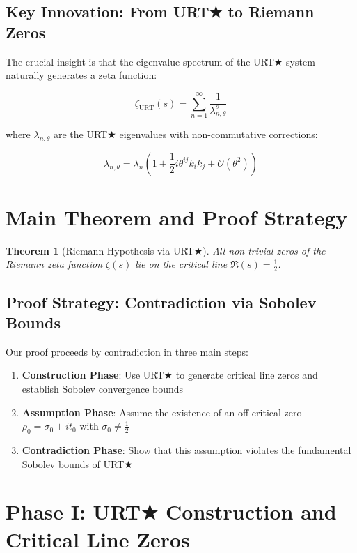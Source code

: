 \documentclass[11pt,a4paper]{article}
\theoremstyle{plain}
\newtheorem{theorem}{Theorem}[section]
\theoremstyle{definition}
\begin{document}
\subsection{Key Innovation: From URT★ to Riemann Zeros}

The crucial insight is that the eigenvalue spectrum of the URT★ system naturally generates a zeta function:

\begin{equation}\label{eq:urt_zeta}
\zeta_{\text{URT}}(s) = \sum_{n=1}^{\infty} \frac{1}{\lambda_{n,\theta}^s}
\end{equation}

where $\lambda_{n,\theta}$ are the URT★ eigenvalues with non-commutative corrections:

\begin{equation}
\lambda_{n,\theta} = \lambda_n \left(1 + \frac{1}{2}i\theta^{ij}k_i k_j + \mathcal{O}(\theta^2)\right)
\end{equation}

\section{Main Theorem and Proof Strategy}

\begin{theorem}[Riemann Hypothesis via URT★]\label{thm:main}
All non-trivial zeros of the Riemann zeta function $\zeta(s)$ lie on the critical line $\Re(s) = \frac{1}{2}$.
\end{theorem}

\subsection{Proof Strategy: Contradiction via Sobolev Bounds}

Our proof proceeds by contradiction in three main steps:

\begin{enumerate}
\item \textbf{Construction Phase}: Use URT★ to generate critical line zeros and establish Sobolev convergence bounds
\item \textbf{Assumption Phase}: Assume the existence of an off-critical zero $\rho_0 = \sigma_0 + it_0$ with $\sigma_0 \neq \frac{1}{2}$
\item \textbf{Contradiction Phase}: Show that this assumption violates the fundamental Sobolev bounds of URT★
\end{enumerate}

\section{Phase I: URT★ Construction and Critical Line Zeros}
\end{document}
